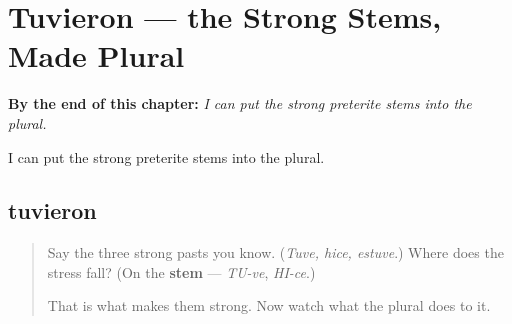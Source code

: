 
\chapter{Tuvieron --- the Strong Stems, Made Plural}
\label{ch:tuvieron}

\begin{chapteropening}
\textbf{By the end of this chapter:} \emph{I can put the strong preterite stems into the plural.}

I can put the strong preterite stems into the plural.
\end{chapteropening}

\section[tuvieron]{tuvieron}

\label{lesson:ES-C55-tuvieron}



\begin{quote}
Say the three strong pasts you know. (\emph{Tuve, hice, estuve}.) Where does the stress fall? (On the \textbf{stem} — \emph{TU-ve}, \emph{HI-ce}.)

That is what makes them strong. Now watch what the plural does to it.
\end{quote}

